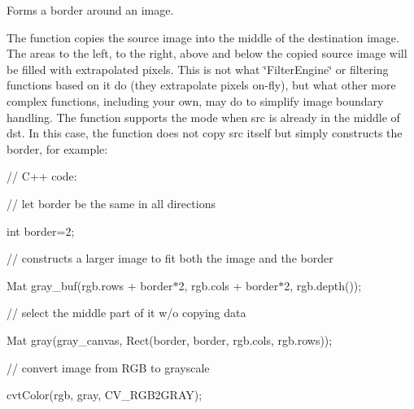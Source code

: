 Forms a border around an image.

The function copies the source image into the middle of the destination image. The areas to the left, to the right, above and below the copied source image will be filled with extrapolated pixels. This is not what \char`\"{}\+Filter\+Engine\char`\"{} or filtering functions based on it do (they extrapolate pixels on-\/fly), but what other more complex functions, including your own, may do to simplify image boundary handling. The function supports the mode when {\ttfamily src} is already in the middle of {\ttfamily dst}. In this case, the function does not copy {\ttfamily src} itself but simply constructs the border, for example\+: {\ttfamily }

{\ttfamily }

{\ttfamily }

{\ttfamily // C++ code\+:}

{\ttfamily }

{\ttfamily }

{\ttfamily // let border be the same in all directions}

{\ttfamily }

{\ttfamily }

{\ttfamily int border=2;}

{\ttfamily }

{\ttfamily }

{\ttfamily // constructs a larger image to fit both the image and the border}

{\ttfamily }

{\ttfamily }

{\ttfamily Mat gray\+\_\+buf(rgb.\+rows + border$\ast$2, rgb.\+cols + border$\ast$2, rgb.\+depth());}

{\ttfamily }

{\ttfamily }

{\ttfamily // select the middle part of it w/o copying data}

{\ttfamily }

{\ttfamily }

{\ttfamily Mat gray(gray\+\_\+canvas, Rect(border, border, rgb.\+cols, rgb.\+rows));}

{\ttfamily }

{\ttfamily }

{\ttfamily // convert image from R\+GB to grayscale}

{\ttfamily }

{\ttfamily }

{\ttfamily cvt\+Color(rgb, gray, C\+V\+\_\+\+R\+G\+B2\+G\+R\+A\+Y);}

